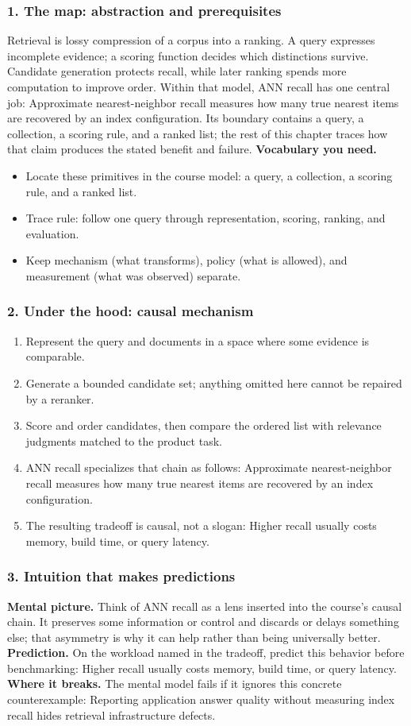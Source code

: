 \subsubsection*{1. The map: abstraction and prerequisites}
Retrieval is lossy compression of a corpus into a ranking. A query expresses incomplete evidence; a scoring function decides which distinctions survive. Candidate generation protects recall, while later ranking spends more computation to improve order.
Within that model, ANN recall has one central job: Approximate nearest-neighbor recall measures how many true nearest items are recovered by an index configuration. Its boundary contains a query, a collection, a scoring rule, and a ranked list; the rest of this chapter traces how that claim produces the stated benefit and failure.
\textbf{Vocabulary you need.}\begin{itemize}
\item Locate these primitives in the course model: a query, a collection, a scoring rule, and a ranked list.
\item Trace rule: follow one query through representation, scoring, ranking, and evaluation.
\item Keep mechanism (what transforms), policy (what is allowed), and measurement (what was observed) separate.
\end{itemize}
\subsubsection*{2. Under the hood: causal mechanism}\begin{enumerate}
\item Represent the query and documents in a space where some evidence is comparable.
\item Generate a bounded candidate set; anything omitted here cannot be repaired by a reranker.
\item Score and order candidates, then compare the ordered list with relevance judgments matched to the product task.
\item ANN recall specializes that chain as follows: Approximate nearest-neighbor recall measures how many true nearest items are recovered by an index configuration.
\item The resulting tradeoff is causal, not a slogan: Higher recall usually costs memory, build time, or query latency.
\end{enumerate}
\subsubsection*{3. Intuition that makes predictions}
\textbf{Mental picture.} Think of ANN recall as a lens inserted into the course's causal chain. It preserves some information or control and discards or delays something else; that asymmetry is why it can help rather than being universally better.
\textbf{Prediction.} On the workload named in the tradeoff, predict this behavior before benchmarking: Higher recall usually costs memory, build time, or query latency.
\textbf{Where it breaks.} The mental model fails if it ignores this concrete counterexample: Reporting application answer quality without measuring index recall hides retrieval infrastructure defects.
